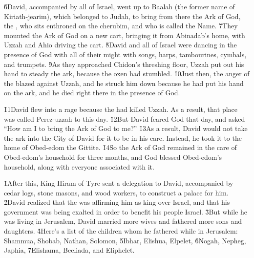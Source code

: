 \v{6}David, accompanied by all of Israel, went up to Baalah (the former name of Kiriath-jearim), which belonged to Judah, to bring from there the Ark of God, the , who sits enthroned on the cherubim, and who is called the Name. \v{7}They mounted the Ark of God on a new cart, bringing it from Abinadab's home, with Uzzah and Ahio driving the cart. \v{8}David and all of Israel were dancing in the presence of God with all of their might with songs, harps, tambourines, cymbals, and trumpets. \v{9}As they approached Chidon's threshing floor, Uzzah put out his hand to steady the ark, because the oxen had stumbled. \v{10}Just then, the anger of the  blazed against Uzzah, and he struck him down because he had put his hand on the ark, and he died right there in the presence of God.

\v{11}David flew into a rage because the  had killed Uzzah. As a result, that place was called Perez-uzzah to this day. \v{12}But David feared God that day, and asked ``How am I to bring the Ark of God to me?'' \v{13}As a result, David would not take the ark into the City of David for it to be in his care. Instead, he took it to the home of Obed-edom the Gittite. \v{14}So the Ark of God remained in the care of Obed-edom's household for three months, and God blessed Obed-edom's household, along with everyone associated with it.

\v{1}After this, King Hiram of Tyre sent a delegation to David, accompanied by cedar logs, stone masons, and wood workers, to construct a palace for him. \v{2}David realized that the  was affirming him as king over Israel, and that his government was being exalted in order to benefit his people Israel. \v{3}But while he was living in Jerusalem, David married more wives and fathered more sons and daughters. \v{4}Here's a list of the children whom he fathered while in Jerusalem: Shammua, Shobab, Nathan, Solomon, \v{5}Ibhar, Elishua, Elpelet, \v{6}Nogah, Nepheg, Japhia, \v{7}Elishama, Beeliada, and Eliphelet.

